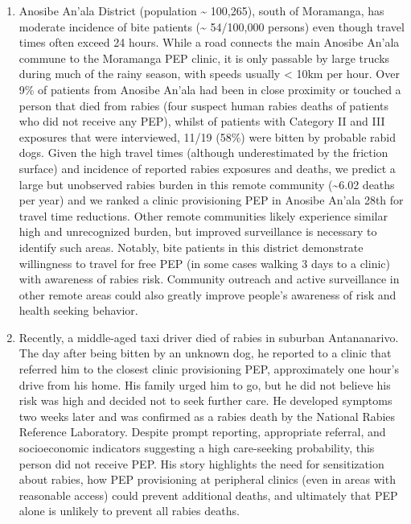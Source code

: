 \documentclass[
]{book}
\begin{document}
\begin{enumerate}
\def\labelenumi{\arabic{enumi}.}
\item
  Anosibe An'ala District (population \textasciitilde{} 100,265), south of Moramanga,
  has moderate incidence of bite patients (\textasciitilde{} 54/100,000 persons) even
  though travel times often exceed 24 hours. While a road connects the
  main Anosibe An'ala commune to the Moramanga PEP clinic, it is only
  passable by large trucks during much of the rainy season, with
  speeds usually \textless{} 10km per hour. Over 9\% of patients from Anosibe
  An'ala had been in close proximity or touched a person that died
  from rabies (four suspect human rabies deaths of patients who did
  not receive any PEP), whilst of patients with Category II and III
  exposures that were interviewed, 11/19 (58\%) were bitten by probable
  rabid dogs. Given the high travel times (although underestimated by
  the friction surface) and incidence of reported rabies exposures and
  deaths, we predict a large but unobserved rabies burden in this
  remote community (\textasciitilde6.02 deaths per year) and we ranked a clinic
  provisioning PEP in Anosibe An'ala 28th for travel time reductions.
  Other remote communities likely experience similar high and
  unrecognized burden, but improved surveillance is necessary to
  identify such areas. Notably, bite patients in this district
  demonstrate willingness to travel for free PEP (in some cases
  walking 3 days to a clinic) with awareness of rabies risk. Community
  outreach and active surveillance in other remote areas could also
  greatly improve people's awareness of risk and health seeking
  behavior.
\item
  Recently, a middle-aged taxi driver died of rabies in suburban
  Antananarivo. The day after being bitten by an unknown dog, he
  reported to a clinic that referred him to the closest clinic
  provisioning PEP, approximately one hour's drive from his home. His
  family urged him to go, but he did not believe his risk was high and
  decided not to seek further care. He developed symptoms two weeks
  later and was confirmed as a rabies death by the National Rabies
  Reference Laboratory. Despite prompt reporting, appropriate
  referral, and socioeconomic indicators suggesting a high
  care-seeking probability, this person did not receive PEP. His story
  highlights the need for sensitization about rabies, how PEP
  provisioning at peripheral clinics (even in areas with reasonable
  access) could prevent additional deaths, and ultimately that PEP
  alone is unlikely to prevent all rabies deaths.
\end{enumerate}
\end{document}
